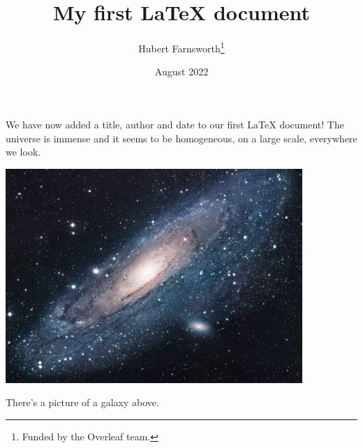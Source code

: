 \documentclass[12pt, letterpaper]{article}
\title{My first LaTeX document}
\author{Hubert Farnsworth\thanks{Funded by the Overleaf team.}}
\date{August 2022}
\begin{document}
\usetikzlibrary{external}
\immediate{}
\tikzexternalize[
    prefix=tmp/,
    mode=list and make,
]

\maketitle
We have now added a title, author and date to our first \LaTeX{} document!
The universe is immense and it seems to be homogeneous, 
on a large scale, everywhere we look.
\\
\begin{center}
    \includegraphics{universe}
\end{center}



There's a picture of a galaxy above.
\end{document}
